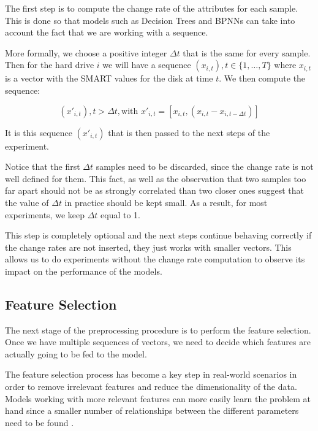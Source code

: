 The first step is to compute the change rate of the attributes for each sample.
This is done so that models such as Decision Trees and BPNNs can take into account the fact that we are working with a sequence.

More formally, we choose a positive integer $\Delta t$ that is the same for every sample.
Then for the hard drive $i$ we will have a sequence $(x_{i,t}), t \in \{1,\dots,T\}$ where $x_{i,t}$ is a vector with the SMART values for the disk at time $t$.
We then compute the sequence:

\begin{equation}\label{eq:change_rate}
(x'_{i,t}), t > \Delta t, \text{with } x'_{i,t} = [x_{i,t}, (x_{i,t} - x_{i,t-\Delta t})]
\end{equation}

It is this sequence $(x'_{i,t})$ that is then passed to the next steps of the experiment.

Notice that the first $\Delta t$ samples need to be discarded, since the change rate is not well defined for them.
This fact, as well as the observation that two samples too far apart should not be as strongly correlated than two closer ones suggest that the value of $\Delta t$ in practice should be kept small.
As a result, for most experiments, we keep $\Delta t$ equal to 1.

This step is completely optional and the next steps continue behaving correctly if the change rates are not inserted, they just works with smaller vectors.
This allows us to do experiments without the change rate computation to observe its impact on the performance of the models.

\subsection{Feature Selection}\label{subsec:feature_selection}

The next stage of the preprocessing procedure is to perform the feature selection.
Once we have multiple sequences of vectors, we need to decide which features are actually going to be fed to the model.

The feature selection process has become a key step in real-world scenarios in order to remove irrelevant features and reduce the dimensionality of the data.
Models working with more relevant features can more easily learn the problem at hand since a smaller number of relationships between the different parameters need to be found \cite{kumar2014feature}.

